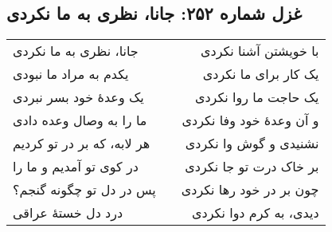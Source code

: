 \begin{center}
\section*{غزل شماره ۲۵۲: جانا، نظری به ما نکردی}
\label{sec:252}
\begin{longtable}{l p{0.5cm} r}
جانا، نظری به ما نکردی
&&
با خویشتن آشنا نکردی
\\
یکدم به مراد ما نبودی
&&
یک کار برای ما نکردی
\\
یک وعدهٔ خود بسر نبردی
&&
یک حاجت ما روا نکردی
\\
ما را به وصال وعده دادی
&&
و آن وعدهٔ خود وفا نکردی
\\
هر لابه، که بر در تو کردیم
&&
نشنیدی و گوش وا نکردی
\\
در کوی تو آمدیم و ما را
&&
بر خاک درت تو جا نکردی
\\
پس در دل تو چگونه گنجم؟
&&
چون بر در خود رها نکردی
\\
درد دل خستهٔ عراقی
&&
دیدی، به کرم دوا نکردی
\\
\end{longtable}
\end{center}
